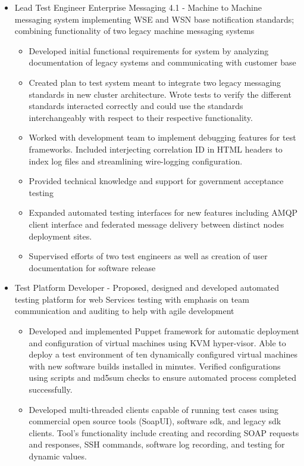 \documentclass[letterpaper,10pt]{article}
\newcommand{\resitem}[1]{\item #1 \vspace{-2pt}}
\begin{document}
\begin{itemize}
\begin{itemize}
		\resitem{Lead Test Engineer Enterprise Messaging 4.1 - Machine to Machine messaging system implementing WSE and WSN base notification standards; combining functionality of two legacy machine messaging systems}
		  \begin{itemize}
		    \item{Developed initial functional requirements for system by analyzing documentation of legacy systems and communicating with customer base}
		    \item{Created plan to test system meant to integrate two legacy messaging standards in new cluster architecture. Wrote tests to verify the different standards interacted correctly and could use the standards interchangeably with respect to their respective functionality.}
		    \item{Worked with development team to implement debugging features for test frameworks. Included interjecting correlation ID in HTML headers to index log files and streamlining wire-logging configuration.}
		    \item{Provided technical knowledge and support for government acceptance testing}
		    \item{Expanded automated testing interfaces for new features including AMQP client interface and federated message delivery between distinct nodes deployment sites.}
		    \item{Supervised efforts of two test engineers as well as creation of user documentation for software release}
		  \end{itemize}
		\resitem{Test Platform Developer - Proposed, designed and developed automated testing platform for web Services testing with emphasis on team communication and auditing to help with agile development }
		  \begin{itemize}
		  	\item{Developed and implemented Puppet framework for automatic deployment and configuration of virtual machines using KVM hyper-visor.  Able to deploy a test environment of ten dynamically configured virtual machines with new software builds installed in minutes.  Verified configurations using scripts and md5sum checks to ensure automated process completed successfully.}
		    \item{Developed multi-threaded clients capable of running test cases using commercial open source tools (SoapUI), software sdk, and legacy sdk clients.  Tool's functionality include creating and recording SOAP requests and responses, SSH commands, software log recording, and testing for dynamic values.}

\end{itemize}
\end{itemize}
\end{itemize}
\end{document}
